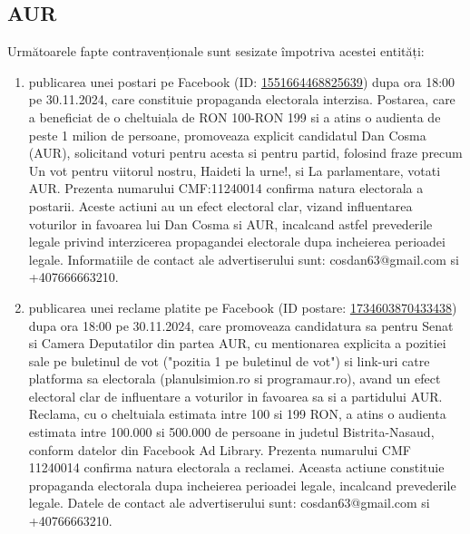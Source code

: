 \documentclass[a4paper,12pt]{article}
\begin{document}
\vspace{0.5cm}

\subsection{AUR}
Următoarele fapte contravenționale sunt sesizate împotriva acestei entități:

\begin{enumerate}[leftmargin=*, label=\arabic*.)]
    \item publicarea unei postari pe Facebook (ID: \href{https://www.facebook.com/ads/library/?id=1551664468825639}{1551664468825639}) dupa ora 18:00 pe 30.11.2024, care constituie propaganda electorala interzisa. Postarea, care a beneficiat de o cheltuiala de RON 100-RON 199 si a atins o audienta de peste 1 milion de persoane, promoveaza explicit candidatul Dan Cosma (AUR), solicitand voturi pentru acesta si pentru partid, folosind fraze precum Un vot pentru viitorul nostru, Haideti la urne!, si La parlamentare, votati AUR.  Prezenta numarului CMF:11240014 confirma natura electorala a postarii.  Aceste actiuni au un efect electoral clar, vizand influentarea voturilor in favoarea lui Dan Cosma si AUR, incalcand astfel prevederile legale privind interzicerea propagandei electorale dupa incheierea perioadei legale.  Informatiile de contact ale advertiserului sunt: cosdan63@gmail.com si +407666663210.
    \item publicarea unei reclame platite pe Facebook (ID postare: \href{https://www.facebook.com/ads/library/?id=1734603870433438}{1734603870433438}) dupa ora 18:00 pe 30.11.2024, care promoveaza candidatura sa pentru Senat si Camera Deputatilor din partea AUR, cu mentionarea explicita a pozitiei sale pe buletinul de vot ("pozitia 1 pe buletinul de vot") si link-uri catre platforma sa electorala (planulsimion.ro si programaur.ro), avand un efect electoral clar de influentare a voturilor in favoarea sa si a partidului AUR. Reclama, cu o cheltuiala estimata intre 100 si 199 RON, a atins o audienta estimata intre 100.000 si 500.000 de persoane in judetul Bistrita-Nasaud, conform datelor din Facebook Ad Library. Prezenta numarului CMF 11240014 confirma natura electorala a reclamei.  Aceasta actiune constituie propaganda electorala dupa incheierea perioadei legale, incalcand prevederile legale.  Datele de contact ale advertiserului sunt: cosdan63@gmail.com si +40766663210.

\end{enumerate}
\end{document}
